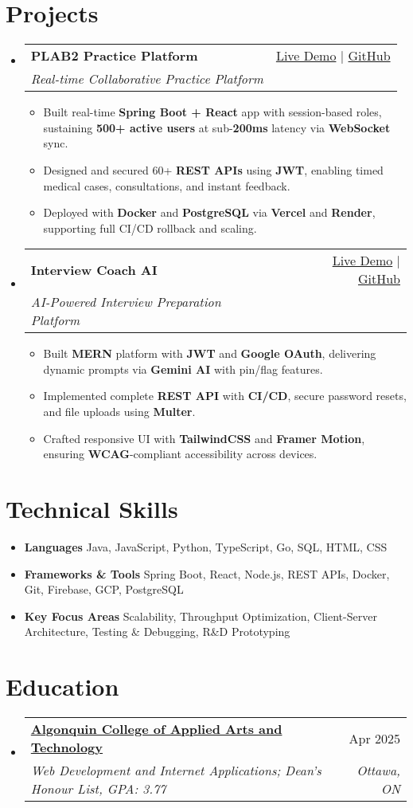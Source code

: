 \documentclass[letterpaper,11pt]{article}
\makeatletter
\newcommand{\resumeItem}[1]{\item\small{#1 \vspace{-2pt}}}
\newcommand{\resumeSubheading}[4]{
  \vspace{-1pt}\item
    \begin{tabular*}{0.97\textwidth}[t]{l@{\extracolsep{\fill}}r}
      \textbf{#1} & #2 \\
      \textit{\small#3} & \textit{\small #4} \\
    \end{tabular*}\vspace{-5pt}
}
\newcommand{\resumeSubHeadingListStart}{\begin{itemize}[leftmargin=*]}
\newcommand{\resumeSubHeadingListEnd}{\end{itemize}}
\newcommand{\resumeItemListStart}{\begin{itemize}}
\newcommand{\resumeItemListEnd}{\end{itemize}\vspace{-5pt}}
\makeatother
\begin{document}
\section{Projects}
  \resumeSubHeadingListStart
    \resumeSubheading
      {\textbf{PLAB2 Practice Platform}}{\href{https://plab2practice.com}{Live Demo} | \href{https://github.com/altansaid/plab2projectnew}{GitHub}}
      {Real-time Collaborative Practice Platform}{}
      \resumeItemListStart
        \resumeItem{Built real-time \textbf{Spring Boot + React} app with session-based roles, sustaining \textbf{500+ active users} at sub-\textbf{200ms} latency via \textbf{WebSocket} sync.}
        \resumeItem{Designed and secured 60+ \textbf{REST APIs} using \textbf{JWT}, enabling timed medical cases, consultations, and instant feedback.}
        \resumeItem{Deployed with \textbf{Docker} and \textbf{PostgreSQL} via \textbf{Vercel} and \textbf{Render}, supporting full CI/CD rollback and scaling.}
      \resumeItemListEnd

    \resumeSubheading
      {\textbf{Interview Coach AI}}{\href{https://interviewcoach-ai.vercel.app/}{Live Demo} | \href{https://github.com/altansaid/interviewcoach-ai}{GitHub}}
      {AI-Powered Interview Preparation Platform}{}
      \resumeItemListStart
        \resumeItem{Built \textbf{MERN} platform with \textbf{JWT} and \textbf{Google OAuth}, delivering dynamic prompts via \textbf{Gemini AI} with pin/flag features.}
        \resumeItem{Implemented complete \textbf{REST API} with \textbf{CI/CD}, secure password resets, and file uploads using \textbf{Multer}.}
        \resumeItem{Crafted responsive UI with \textbf{TailwindCSS} and \textbf{Framer Motion}, ensuring \textbf{WCAG}-compliant accessibility across devices.}
      \resumeItemListEnd
  \resumeSubHeadingListEnd

\section{Technical Skills}
  \resumeItemListStart
    \resumeItem{\textbf{Languages}}{Java, JavaScript, Python, TypeScript, Go, SQL, HTML, CSS}
    \resumeItem{\textbf{Frameworks \& Tools}}{Spring Boot, React, Node.js, REST APIs, Docker, Git, Firebase, GCP, PostgreSQL}
    \resumeItem{\textbf{Key Focus Areas}}{Scalability, Throughput Optimization, Client-Server Architecture, Testing \& Debugging, R\&D Prototyping}
  \resumeItemListEnd

\section{Education}
  \resumeSubHeadingListStart
    \resumeSubheading
      {\href{https://www.algonquincollege.com/sat/program/web-development-internet-applications/}{Algonquin College of Applied Arts and Technology}}{Apr 2025}
      {Web Development and Internet Applications; Dean's Honour List, GPA: 3.77}{Ottawa, ON}
  \resumeSubHeadingListEnd
\end{document}
